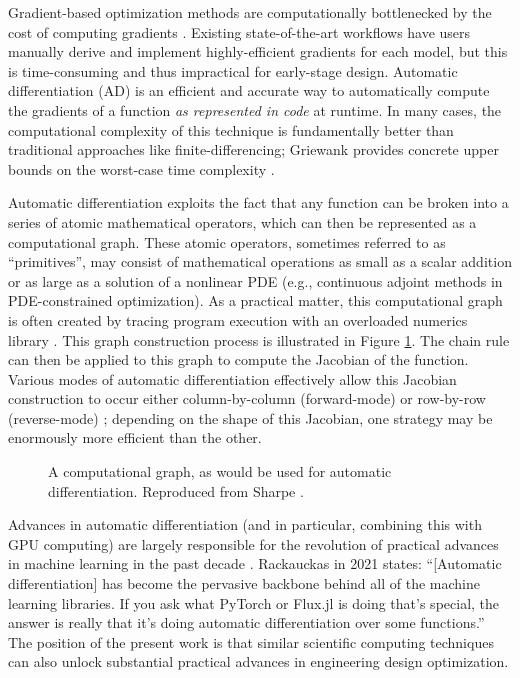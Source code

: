 Gradient-based optimization methods are computationally bottlenecked by the cost of computing gradients \cite{lyu_benchmarking_2014, martins_engineering_2021}. Existing state-of-the-art workflows have users manually derive and implement highly-efficient gradients for each model, but this is time-consuming and thus impractical for early-stage design. Automatic differentiation (AD) is an efficient and accurate way to automatically compute the gradients of a function \textit{as represented in code} at runtime. In many cases, the computational complexity of this technique is fundamentally better than traditional approaches like finite-differencing; Griewank provides concrete upper bounds on the worst-case time complexity \cite{griewank_automatic_1988}.

Automatic differentiation exploits the fact that any function can be broken into a series of atomic mathematical operators, which can then be represented as a computational graph. These atomic operators, sometimes referred to as ``primitives'', may consist of mathematical operations as small as a scalar addition or as large as a solution of a nonlinear PDE (e.g., continuous adjoint methods in PDE-constrained optimization). As a practical matter, this computational graph is often created by tracing program execution with an overloaded numerics library \cite{maclaurin_autograd_2015}. This graph construction process is illustrated in Figure \ref{fig:computational-graph}. The chain rule can then be applied to this graph to compute the Jacobian of the function. Various modes of automatic differentiation effectively allow this Jacobian construction to occur either column-by-column (forward-mode) or row-by-row (reverse-mode) \cite{casadi, jax, martins_engineering_2021}; depending on the shape of this Jacobian, one strategy may be enormously more efficient than the other.

\begin{figure}[H]
    \centering
    \centerline{}
    \caption{A computational graph, as would be used for automatic differentiation. Reproduced from Sharpe \cite{sharpe_aerosandbox_2021}.}
    \label{fig:computational-graph}
\end{figure}

Advances in automatic differentiation (and in particular, combining this with GPU computing) are largely responsible for the revolution of practical advances in machine learning in the past decade \cite{baydin_automatic_2018}. Rackauckas in 2021 \cite{rackauckas_generalizing_2021} states: ``[Automatic differentiation] has become the pervasive backbone behind all of the machine learning libraries. If you ask what PyTorch or Flux.jl is doing that’s special, the answer is really that it’s doing automatic differentiation over some functions.'' The position of the present work is that similar scientific computing techniques can also unlock substantial practical advances in engineering design optimization.

